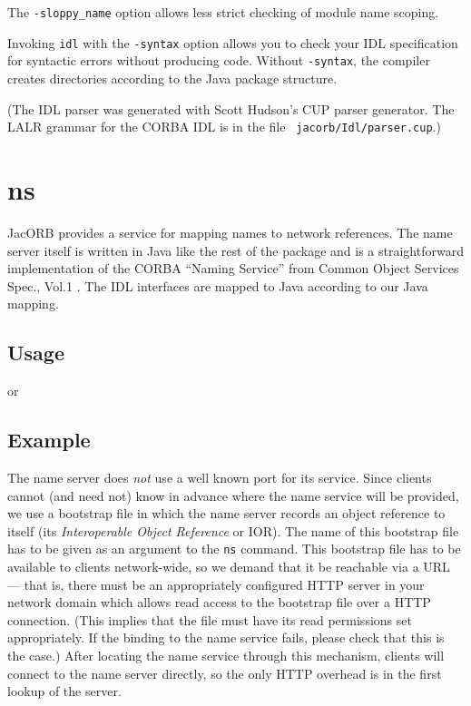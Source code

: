 The {\tt -sloppy\_name} option allows less strict checking of module
name scoping.

Invoking {\tt idl}  with the {\tt -syntax} option  allows you to check
your IDL  specification for  syntactic errors without  producing code.
Without {\tt  -syntax}, the compiler creates  directories according to
the Java package structure.

(The  IDL  parser  was   generated  with  Scott  Hudson's  CUP  parser
generator.  The  LALR grammar for  the CORBA IDL  is in the  file {\tt
jacorb/Idl/parser.cup}.)

\section{ns}

JacORB provides a service for mapping names to network references. The
name server itself is written in Java like the rest of the package and
is a  straightforward implementation  of the CORBA  ``Naming Service''
from  Common  Object Services  Spec.,  Vol.1  \cite{OMG1997}. The  IDL
interfaces are mapped to Java according to our Java mapping.

\subsection*{Usage}


or


\subsection*{Example}


The name server does {\it not}  use a well known port for its service.
Since clients  cannot (and  need not) know  in advance where  the name
service will  be provided, we use  a bootstrap file in  which the name
server records  an object reference to itself  (its {\it Interoperable
Object Reference} or  IOR). The name of this bootstrap  file has to be
given as an argument to the  {\tt ns} command. This bootstrap file has
to  be available  to clients  network-wide, so  we demand  that  it be
reachable  via a  URL  --- that  is,  there must  be an  appropriately
configured HTTP server in your network domain which allows read access
to the bootstrap  file over a HTTP connection.  (This implies that the
file must have its read  permissions set appropriately. If the binding
to the name service fails, please  check that this is the case.) After
locating the name service through this mechanism, clients will connect
to the name server directly, so the only HTTP overhead is in the first
lookup of the server.

